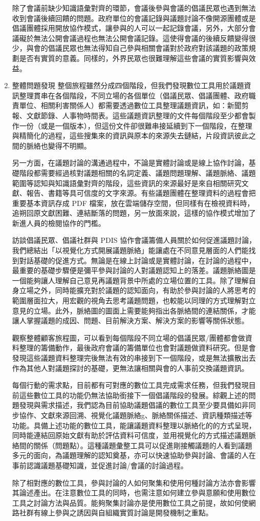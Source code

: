 \documentclass[12pt,a4paper]{article}
\begin{document}
\begin{enumerate}
除了會議前缺少知識語彙對齊的環節，會議後參與會議的倡議民眾也遇到無法收到會議後續回饋的問題。政府單位的會議記錄與議題討論不像開源團體或是倡議團體採用開放協作模式，讓參與的人可以一起記錄會議，另外，大部分會議礙於無法公開會議過程也無法公開會議記錄。這使得會議的後續反饋變得很少，與會的倡議民眾也無法得知自己參與相關會議對於政府對該議題的政策規劃是否有實質的意義。同樣的，外界民眾也很難理解這些會議的實質影響與效益。
\item 整體問題發現
\label{sec:orgddffd3f}
整個旅程雖然分成四個階段，但我們發現數位工具用於議題資訊整理貫串在各個階段，不同立場的各個單位（倡議民眾、倡議團體、政府職責單位、相關利害關係人）都需要透過數位工具整理議題資訊，如：新聞剪報、文獻節錄、人事物時間表。這些議題資訊整理的文件每個階段至少都會製作一份（或是一個版本），但這份文件卻很難串接延續到下一個階段，在整理與精簡化的過程，這些搜集來的資訊與原本的來源失去鏈結，片段資訊彼此之間的脈絡也變得不明顯。

另一方面，在議題討論的溝通過程中，不論是實體討論或是線上協作討論，基礎階段都需要經過核對議題相關的名詞定義、議題問題理解、議題脈絡、議題範圍等認知與知識語彙對齊的階段，這些資訊的來源最好是來自相關研究文獻、報告、書籍等具可信度的文字來源。有些議題團體在整理資料的過程會把重要基本資訊存成 PDF 檔案，放在雲端儲存空間，但同樣有在檢視資料時，追朔回原文獻困難、連結斷落的問題，另一放面來說，這樣的協作模式增加了新進人員的檢閱協作的門檻。

訪談倡議民眾、倡議社群與 PDIS 協作會議籌備人員關於如何促進議題討論，我們總結出「以視覺化方式開展議題脈絡」能讓處在不同意見層面的人們能找到對話基礎的促進方式。無論是在線上討論或是實體討論，在討論的過程中，最重要的基礎步驟便是彌平參與討論的人對議題認知上的落差。議題脈絡圖是一個能夠讓人理解自己意見再議題背景中所處的立場位置的工具。除了理解自身立場之外，同時能擴充對於議題的認知面向，有助於參與討論的人將思考的範圍層面拉大，用宏觀的視角去思考議題問題，也較能以同理的方式理解對立意見的立場。此外，脈絡圖的圖面上需要能夠指出各脈絡間的連結關係，才能讓人掌握議題的成因、問題、目前解決方案、解決方案的影響等關係狀態。

觀察整體顧客旅程圖，可以看到每個階段不同立場的倡議民眾/團體都會做資料整理的籌備動作，最後政府會議的籌備單位也會對議題做資料研究。但是會發現這些議題資料整理完後無法有效的串接到下一個階段，或是無法擴散出去作為其他人對議題探討的基礎，更無法讓相關與會的人事前交換議題資訊。

每個行動的需求點，目前都有可對應的數位工具完成需求任務，但我們發現目前這些數位工具的功能仍無法協助銜接下一個倡議階段的發展。綜觀上述的問題發現與需求描述，我們認為目前協助議題倡議的數位工具至少要具備如非同步協作、文獻來源回溯、視覺化議題脈絡g、脈絡關係描述、資訊種類描述等功能。具備上述功能的數位工具，能讓議題資料整理以脈絡化的的方式呈現，同時能連結回原始文獻有助於評估資料可信度，並用視覺化的方式描述議題脈絡間的關係（問題點）。這種議題彙整工具可以促進剛接觸議題的人看到議題多元的面向，為議題理解的認知奠基，亦可以快速協助參與討論、會議的人在事前認識議題基礎知識，並促進討論/會議的討論過程。

除了相對應的數位工具，參與討論的人如何聚集和使用何種討論方法亦會影響其論述產出。在注意數位工具的同時，也需注意如何建立參與意願和使用數位工具之討論方法與品質。能夠聚集討論亦是使用數位工具之前提，故如何使網路社群有線上參與之誘因與自組織實質討論是開發機制之重點。
\end{enumerate}
\end{document}
